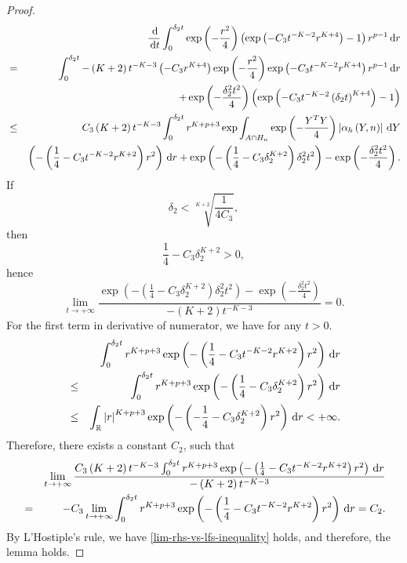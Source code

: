 \begin{proof}
\begin{eqnarray*}
 &  & \frac{\,\mathrm{d}}{\,\mathrm{d} t}\int_{0}^{\delta_{2}t}\exp\left(-\frac{r^{2}}{4}\right)\left(\exp\left(-C_{3}t^{-K-2}r^{K+4}\right)-1\right)r^{p-1}\,\mathrm{d} r\\
 & = & \int_{0}^{\delta_{2}t}-\left(K+2\right)t^{-K-3}\left(-C_{3}r^{K+4}\right)\exp\left(-\frac{r^{2}}{4}\right)\exp\left(-C_{3}t^{-K-2}r^{K+4}\right)r^{p-1}\,\mathrm{d} r\\
 &  & +\exp\left(-\frac{\delta_{2}^{2}t^{2}}{4}\right)\left(\exp\left(-C_{3}t^{-K-2}\left(\delta_{2}t\right)^{K+4}\right)-1\right)\\
 & \le & C_{3}\left(K+2\right)t^{-K-3}\int_{0}^{\delta_{2}t}r^{K+p+3}\exp\int_{A\cap H_{n}}\exp\left(-\frac{Y^{T}Y}{4}\right)\left|\alpha_{h}\left(Y,n\right)\right|\,\mathrm{d} Y\\
 &  & \left(-\left(\frac{1}{4}-C_{3}t^{-K-2}r^{K+2}\right)r^{2}\right)\,\mathrm{d} r+\exp\left(-\left(\frac{1}{4}-C_{3}\delta_{2}^{K+2}\right)\delta_{2}^{2}t^{2}\right)-\exp\left(-\frac{\delta_{2}^{2}t^{2}}{4}\right).
\end{eqnarray*}
If 
\[
\delta_{2}<\sqrt[K+2]{\frac{1}{4C_{3}}},
\]
then 
\[
\frac{1}{4}-C_{3}\delta_{2}^{K+2}>0,
\]
hence 
\[
\lim_{t\rightarrow+\infty}\frac{\exp\left(-\left(\frac{1}{4}-C_{3}\delta_{2}^{K+2}\right)\delta_{2}^{2}t^{2}\right)-\exp\left(-\frac{\delta_{2}^{2}t^{2}}{4}\right)}{-\left(K+2\right)t^{-K-3}}=0.
\]
For the first term in derivative of numerator, we have for any $t>0$.
\begin{eqnarray*}
 &  & \int_{0}^{\delta_{2}t}r^{K+p+3}\exp\left(-\left(\frac{1}{4}-C_{3}t^{-K-2}r^{K+2}\right)r^{2}\right)\,\mathrm{d} r\\
 & \le & \int_{0}^{\delta_{2}t}r^{K+p+3}\exp\left(-\left(\frac{1}{4}-C_{3}\delta_{2}^{K+2}\right)r^{2}\right)\,\mathrm{d} r\\
 & \le & \int_{\mathbb{R}}\left|r\right|^{K+p+3}\exp\left(-\left(-\frac{1}{4}-C_{3}\delta_{2}^{K+2}\right)r^{2}\right)\,\mathrm{d} r<+\infty.
\end{eqnarray*}
Therefore, there exists a constant $C_{2}$, such that 
\begin{eqnarray*}
 &  & \lim_{t\rightarrow+\infty}\frac{C_{3}\left(K+2\right)t^{-K-3}\int_{0}^{\delta_{2}t}r^{K+p+3}\exp\left(-\left(\frac{1}{4}-C_{3}t^{-K-2}r^{K+2}\right)r^{2}\right)\,\mathrm{d} r}{-\left(K+2\right)t^{-K-3}}\\
 & = & -C_{3}\lim_{t\rightarrow+\infty}\int_{0}^{\delta_{2}t}r^{K+p+3}\exp\left(-\left(\frac{1}{4}-C_{3}t^{-K-2}r^{K+2}\right)r^{2}\right)\,\mathrm{d} r=C_{2}.
\end{eqnarray*}
By L'Hostiple's rule, we have \eqref{lim-rhs-vs-lfs-inequality} holds,
and therefore, the lemma holds.
\end{proof}

